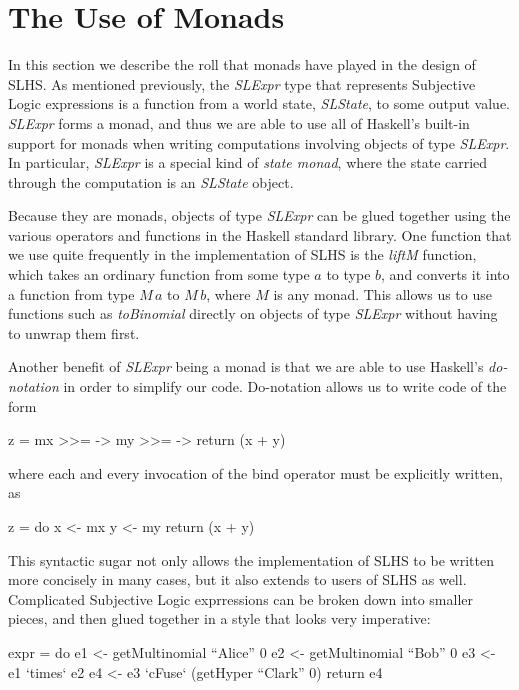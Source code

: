 \documentclass[thesis.tex]{subfiles}
\begin{document}
\section{The Use of Monads}
\label{sec:monads}

In this section we describe the roll that monads have played in the design of SLHS. As mentioned
previously, the \emph{SLExpr} type that represents Subjective Logic expressions is a function from
a world state, \emph{SLState}, to some output value. \emph{SLExpr} forms a monad, and thus we are
able to use all of Haskell's built-in support for monads when writing computations involving
objects of type \emph{SLExpr}. In particular, \emph{SLExpr} is a special kind of \emph{state monad},
where the state carried through the computation is an \emph{SLState} object.

Because they are monads, objects of type \emph{SLExpr} can be glued together using the various
operators and functions in the Haskell standard library. One function that we use quite frequently
in the implementation of SLHS is the \emph{liftM} function, which takes an ordinary function from
some type $a$ to type $b$, and converts it into a function from type $M\,a$ to $M\,b$, where $M$ is
any monad. This allows us to use functions such as \emph{toBinomial} directly on objects of type
\emph{SLExpr} without having to unwrap them first.

Another benefit of \emph{SLExpr} being a monad is that we are able to use Haskell's \emph{do-notation}
in order to simplify our code. Do-notation allows us to write code of the form

\begin{spec}
z = mx >>= \x -> my >>= \y -> return (x + y)
\end{spec}

where each and every invocation of the bind operator must be explicitly written, as

\begin{spec}
z = do x <- mx
       y <- my
       return (x + y)
\end{spec}

This syntactic sugar not only allows the implementation of SLHS to be written more
concisely in many cases, but it also extends to users of SLHS as well. Complicated
Subjective Logic exprressions can be broken down into smaller pieces, and then glued
together in a style that looks very imperative:

\begin{spec}
expr = do e1 <- getMultinomial ``Alice'' 0
          e2 <- getMultinomial ``Bob'' 0
          e3 <- e1 `times` e2
          e4 <- e3 `cFuse` (getHyper ``Clark'' 0)
          return e4
\end{spec}
\end{document}
